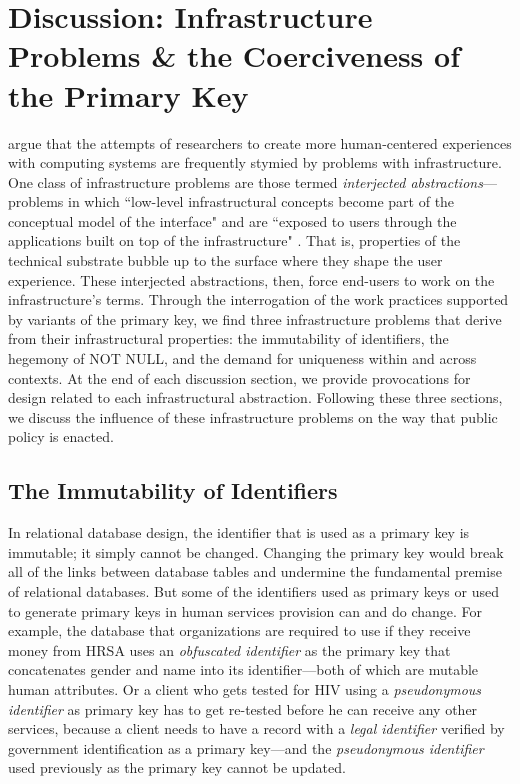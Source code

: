\section{Discussion: Infrastructure Problems \& the Coerciveness of the Primary Key}
\citet{Edwards2010InfraProb} argue that the attempts of researchers to create more human-centered experiences with computing systems are frequently stymied by problems with infrastructure. One class of infrastructure problems are those termed \textit{interjected abstractions}---problems in which ``low-level infrastructural concepts become part of the conceptual model of the interface" and are ``exposed to users through the applications built on top of the infrastructure" \citep{Edwards2010InfraProb}.  That is, properties of the technical substrate bubble up to the surface where they shape the user experience. These interjected abstractions, then, force end-users to work on the infrastructure's terms. Through the interrogation of the work practices supported by variants of the primary key, we find three infrastructure problems that derive from their infrastructural properties: the immutability of identifiers, the hegemony of NOT NULL, and the demand for uniqueness within and across contexts. At the end of each discussion section, we provide provocations for design related to each infrastructural abstraction. Following these three sections, we discuss the influence of these infrastructure problems on the way that public policy is enacted.

\subsection{The Immutability of Identifiers}
In relational database design, the identifier that is used as a primary key is immutable; it simply cannot be changed. Changing the primary key would break all of the links between database tables and undermine the fundamental premise of relational databases. But some of the identifiers used as primary keys or used to generate primary keys in human services provision can and do change. For example, the database that organizations are required to use if they receive money from HRSA uses an \textit{obfuscated identifier} as the primary key that concatenates gender and name into its identifier---both of which are mutable human attributes. Or a client who gets tested for HIV using a \textit{pseudonymous identifier} as primary key has to get re-tested before he can receive any other services, because a client needs to have a record with a \textit{legal identifier} verified by government identification as a primary key---and the \textit{pseudonymous identifier} used previously as the primary key cannot be updated.  

